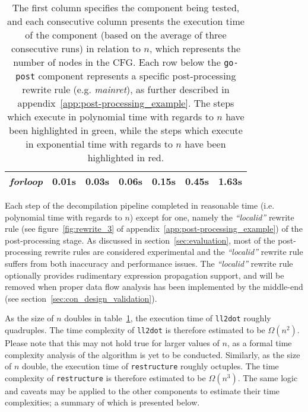 \begin{table}[htbp]
\begin{center}
\begin{tabular}{|l|l|l|l|l|l|l|}
			\rowcolor{light_green_3}
			\textit{forloop} & 0.01s & 0.03s & 0.06s & 0.15s & 0.45s & 1.63s \\
			\hline
		\end{tabular}
	\end{center}
	\caption{The first column specifies the component being tested, and each consecutive column presents the execution time of the component (based on the average of three consecutive runs) in relation to $ n $, which represents the number of nodes in the CFG. Each row below the \texttt{go-post} component represents a specific post-processing rewrite rule (e.g. \textit{mainret}), as further described in appendix~\ref{app:post-processing_example}. The steps which execute in polynomial time with regards to $ n $ have been highlighted in green, while the steps which execute in exponential time with regards to $ n $ have been highlighted in red.}
	\label{tbl:run_time_summary}
\end{table}

Each step of the decompilation pipeline completed in reasonable time (i.e. polynomial time with regards to $ n $) except for one, namely the \textit{``localid''} rewrite rule (see figure~\ref{fig:rewrite_3} of appendix~\ref{app:post-processing_example}) of the post-processing stage. As discussed in section~\ref{sec:evaluation}, most of the post-processing rewrite rules are considered experimental and the \textit{``localid''} rewrite rule suffers from both inaccuracy and performance issues. The \textit{``localid''} rewrite rule optionally provides rudimentary expression propagation support, and will be removed when proper data flow analysis has been implemented by the middle-end (see section~\ref{sec:con_design_validation}).

As the size of $ n $ doubles in table~\ref{tbl:run_time_summary}, the execution time of \texttt{ll2dot} roughly quadruples. The time complexity of \texttt{ll2dot} is therefore estimated to be $ \Omega(n^{2}) $. Please note that this may not hold true for larger values of $ n $, as a formal time complexity analysis of the algorithm is yet to be conducted. Similarly, as the size of $ n $ double, the execution time of \texttt{restructure} roughly octuples. The time complexity of \texttt{restructure} is therefore estimated to be $ \Omega(n^{3}) $. The same logic and caveats may be applied to the other components to estimate their time complexities; a summary of which is presented below.

